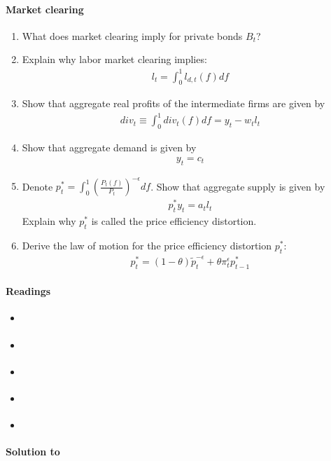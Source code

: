 \paragraph{Market clearing}
\begin{enumerate}[resume]
	\item What does market clearing imply for private bonds \(B_t\)?
	\item Explain why labor market clearing implies:
	\begin{align*}
		l_t = \int_0^1 l_{d,t}(f) df
	\end{align*}
	\item Show that aggregate real profits of the intermediate firms are given by
	\begin{align*}
	div_t \equiv \int_{0}^{1} div_t(f) df = y_t - w_t l_t
	\end{align*}
	\item Show that aggregate demand is given by
	\begin{align}
	y_t = c_t
	\end{align}
	\item Denote \(p_t^* = \int_{0}^1 {\left(\frac{P_t(f)}{P_t}\right)}^{-\epsilon} df\).
	Show that aggregate supply is given by
	\begin{align*}
	p_t^* y_t = a_t l_t
	\end{align*}
	Explain why \(p_t^*\) is called the price efficiency distortion.
	\item Derive the law of motion for the price efficiency distortion \(p_t^*\):
	\begin{align}
	p_{t}^*=\left(1-\theta\right) \widetilde{p}_t^{-\epsilon}+\theta \pi_{t}^{\epsilon} p_{t-1}^*
	\end{align}
\end{enumerate}

\paragraph{Readings}
\begin{itemize}
	\item \textcite[Ch.~3]{Gali_2015_MonetaryPolicyInflation}
	\item \textcite[Ch.~19]{Heijdra_2017_FoundationsModernMacroeconomics}
	\item \textcite[Ch.~7]{Romer_2019_AdvancedMacroeconomics}
	\item \textcite[Ch.~3]{Woodford_2003_InterestPricesFoundations}	
	\item \textcite[Ch.~8]{Walsh_2017_MonetaryTheoryPolicy}
\end{itemize}

\begin{solution}\textbf{Solution to }
\ifDisplaySolutions

\fi
\newpage
\end{solution}